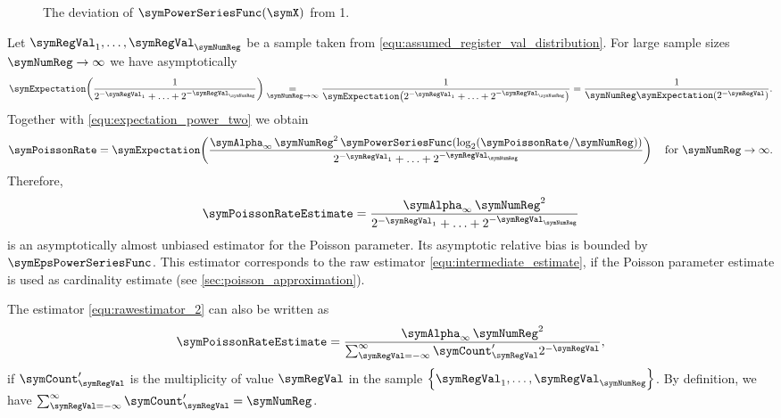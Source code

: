 \documentclass[a4paper]{scrartcl}
\begin{document}
\begin{figure}
\centering

\caption{The deviation of $\symPowerSeriesFunc(\symX)$ from 1.}
\label{fig:power_series_func}
\end{figure}


Let $\symRegVal_1,\ldots,\symRegVal_\symNumReg$ be a sample taken from \eqref{equ:assumed_register_val_distribution}. For large sample sizes $\symNumReg\rightarrow \infty$ we have asymptotically
\begin{equation}
\symExpectation\!\left(
\frac{1}{2^{-\symRegVal_1}+\ldots+2^{-\symRegVal_\symNumReg}}
\right)
\underset{\symNumReg\rightarrow \infty}{=}
\frac{1}{\symExpectation
\!\left(2^{-\symRegVal_1}+\ldots+2^{-\symRegVal_\symNumReg}\right)}
=
\frac{1}{\symNumReg \symExpectation\!\left(2^{-\symRegVal}\right)}.
\end{equation}
Together with \eqref{equ:expectation_power_two} we obtain
\begin{equation}
\symPoissonRate
=
\symExpectation\!\left(
\frac{\symAlpha_\infty\,\symNumReg^2\,\symPowerSeriesFunc\!\left(\log_2\!\left( \symPoissonRate/\symNumReg\right)\right)}{2^{-\symRegVal_1}+\ldots+2^{-\symRegVal_\symNumReg}}
\right)
\quad
\text{for $\symNumReg\rightarrow \infty$}.
\end{equation}
Therefore, 
\begin{equation}
\label{equ:rawestimator_2}
\symPoissonRateEstimate 
= 
\frac{\symAlpha_\infty\,\symNumReg^2}{2^{-\symRegVal_1}+\ldots+2^{-\symRegVal_\symNumReg}}
\end{equation}
is an asymptotically almost unbiased estimator for the Poisson parameter. Its asymptotic relative bias is bounded by $\symEpsPowerSeriesFunc$. This estimator corresponds to the raw estimator \eqref{equ:intermediate_estimate}, if the Poisson parameter estimate is used as cardinality estimate (see \cref{sec:poisson_approximation}).

The estimator \eqref{equ:rawestimator_2} can also be written as
\begin{equation}
\label{equ:raw_estimate_with_multiplicities}
\symPoissonRateEstimate 
= 
\frac{\symAlpha_\infty\,\symNumReg^2}{\sum_{\symRegVal=-\infty}^\infty \symCount'_\symRegVal 2^{-\symRegVal}},
\end{equation}
if $\symCount'_\symRegVal$ is the multiplicity of value $\symRegVal$ in the sample $\left\lbrace \symRegVal_1,\ldots,\symRegVal_\symNumReg\right\rbrace$. 
By definition, we have $\sum_{\symRegVal=-\infty}^\infty \symCount'_\symRegVal = \symNumReg$. 
\end{document}
